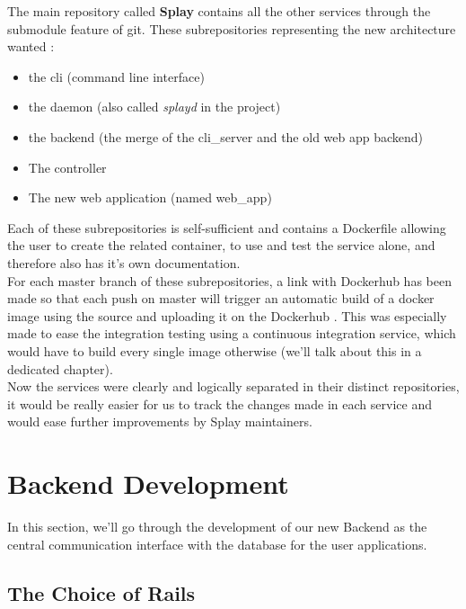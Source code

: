 \documentclass{eplmastersthesis}
\begin{document}
        The main repository called \textbf{Splay} contains all the other services
        through the submodule \cite{GitSubmodules} feature of git. These
        subrepositories representing the new architecture wanted :

        \begin{itemize}
          \item the cli (command line interface)
          \item the daemon (also called \textit{splayd} in the project)
          \item the backend (the merge of the cli\_server and the old web app backend)
          \item The controller
          \item The new web application (named web_app)
        \end{itemize}

        Each of these subrepositories is self-sufficient and contains a Dockerfile
        allowing the user to create the related container, to use and test
        the service alone, and therefore also has it's own documentation.\\

        For each master branch of these subrepositories, a link with Dockerhub
        has been made so that each push on master will trigger an automatic build
        of a docker image using the source and uploading it on the Dockerhub
        \cite{DockerHubGithub}.
        This was especially made to ease the integration testing using a
        continuous integration service, which would have to build every single
        image otherwise (we'll talk about this in a dedicated chapter).\\

        Now the services were clearly and logically separated in their
        distinct repositories, it would be really easier for us to track
        the changes made in each service and would ease further improvements
        by Splay maintainers.

    \section{Backend Development}

      In this section, we'll go through the development of our new Backend
      as the central communication interface with the database for the user
      applications.\\

      \subsection{The Choice of Rails}
\end{document}

